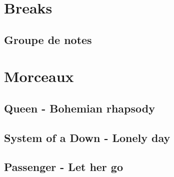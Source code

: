 \documentclass{article}
\begin{document}
\section{Breaks}		
    
    \subsection{Groupe de notes}

    

\newpage
\section{Morceaux}
    
    \subsection{Queen - Bohemian rhapsody}
    
    \newpage
    \subsection{System of a Down - Lonely day}
    
    \newpage
    \subsection{Passenger - Let her go}
    
\end{document}
